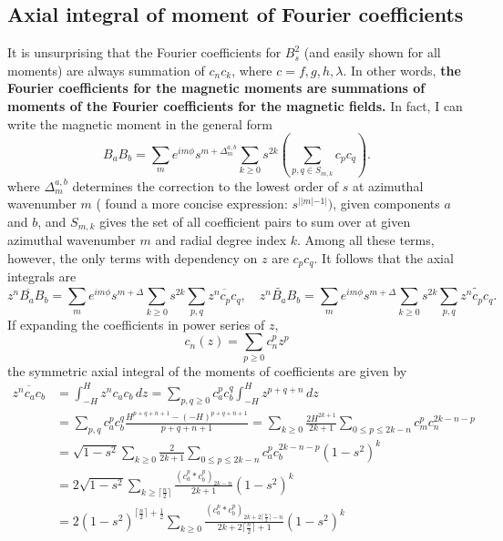 \subsection{Axial integral of moment of Fourier coefficients}

It is unsurprising that the Fourier coefficients for $B_s^2$ (and easily shown for all moments) are always summation of $c_n c_k$, where $c=f, g, h, \lambda$. In other words, \textbf{the Fourier coefficients for the magnetic moments are summations of moments of the Fourier coefficients for the magnetic fields.} In fact, I can write the magnetic moment in the general form
\[
    B_a B_b = \sum_m e^{im\phi} s^{m + \Delta_m^{a,b}} \sum_{k \geq 0} s^{2k} \left(\sum_{p,q\in S_{m,k}} c_p c_q\right).
\]
where $\Delta_m^{a,b}$ determines the correction to the lowest order of $s$ at azimuthal wavenumber $m$ (\textcite{holdenried-chernoff_long_2021} found a more concise expression: $s^{||m|-1|})$, given components $a$ and $b$, and $S_{m,k}$ gives the set of all coefficient pairs to sum over at given azimuthal wavenumber $m$ and radial degree index $k$. Among all these terms, however, the only terms with dependency on $z$ are $c_p c_q$. It follows that the axial integrals are
\[
    \overline{z^n B_a B_b} = \sum_m e^{im\phi} s^{m + \Delta} \sum_{k \geq 0} s^{2k} \sum_{p,q} \overline{z^n c_p c_q},\quad
    \widetilde{z^n B_a B_b} = \sum_m e^{im\phi} s^{m + \Delta} \sum_{k \geq 0} s^{2k} \sum_{p,q} \widetilde{z^n c_p c_q}.
\]
If expanding the coefficients in power series of $z$, 
\[
    c_n (z) = \sum_{p \geq 0} c_n^p z^p
\]
the symmetric axial integral of the moments of coefficients are given by
\begin{equation}
\begin{aligned}
    \overline{z^n c_a c_b} &= \int_{-H}^H z^n c_a c_b \, dz = \sum_{p, q \geq 0} c_a^p c_b^q \int_{-H}^H z^{p + q + n} \, dz \\
    &= \sum_{p,q} c_a^p c_b^q \frac{H^{p+q+n+1} - (-H)^{p+q+n+1}}{p + q + n + 1} 
    = \sum_{k\geq 0} \frac{2H^{2k+1}}{2k+1} \sum_{0\leq p \leq 2k-n} c_m^p c_n^{2k-n-p} \\ 
    &= \sqrt{1-s^2} \sum_{k\geq 0} \frac{2}{2k+1} \sum_{0\leq p \leq 2k-n} c_a^p c_b^{2k-n-p} \left(1-s^2\right)^k \\
    &= 2 \sqrt{1-s^2} \sum_{k\geq \lceil \frac{n}{2} \rceil} \frac{\left(c_a^{p} * c_b^p\right)_{2k-n}}{2k+1} \left(1 - s^2\right)^k \\ 
    &= 2 \left(1 - s^2\right)^{\lceil \frac{n}{2} \rceil + \frac{1}{2}} \sum_{k\geq 0} \frac{\left(c_a^{p} * c_b^p\right)_{2k+2\lceil \frac{n}{2} \rceil-n}}{2k+2\lceil\frac{n}{2}\rceil + 1} \left(1 - s^2\right)^k
\end{aligned}
\end{equation}
